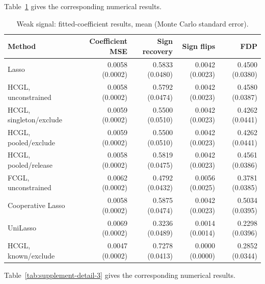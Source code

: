 \documentclass[11pt,a4paper]{article}
\begin{document}
\noindent Table~\ref{tab:supplement-detail-2} gives the corresponding numerical results.

\begin{table}[htbp]\centering\small\setlength{\tabcolsep}{4pt}
\caption{Weak signal: fitted-coefficient results, mean (Monte Carlo standard error).}
\begin{tabular}{lrrrr}\toprule
Method & Coefficient MSE & Sign recovery & Sign flips & FDP\\\midrule
Lasso & 0.0058 (0.0002) & 0.5833 (0.0480) & 0.0042 (0.0023) & 0.4500 (0.0380) \\
HCGL, unconstrained & 0.0058 (0.0002) & 0.5792 (0.0474) & 0.0042 (0.0023) & 0.4580 (0.0387) \\
HCGL, singleton/exclude & 0.0059 (0.0002) & 0.5500 (0.0510) & 0.0042 (0.0023) & 0.4262 (0.0441) \\
HCGL, pooled/exclude & 0.0059 (0.0002) & 0.5500 (0.0510) & 0.0042 (0.0023) & 0.4262 (0.0441) \\
HCGL, pooled/release & 0.0058 (0.0002) & 0.5819 (0.0475) & 0.0042 (0.0023) & 0.4561 (0.0386) \\
FCGL, unconstrained & 0.0062 (0.0002) & 0.4792 (0.0432) & 0.0056 (0.0025) & 0.3781 (0.0385) \\
Cooperative Lasso & 0.0058 (0.0002) & 0.5875 (0.0474) & 0.0042 (0.0023) & 0.5034 (0.0395) \\
UniLasso & 0.0069 (0.0002) & 0.3236 (0.0489) & 0.0014 (0.0014) & 0.2298 (0.0396) \\
HCGL, known/exclude & 0.0047 (0.0002) & 0.7278 (0.0413) & 0.0000 (0.0000) & 0.2852 (0.0344) \\
\bottomrule\end{tabular}
\label{tab:supplement-detail-2}
\end{table}

\noindent Table~\ref{tab:supplement-detail-3} gives the corresponding numerical results.
\end{document}
